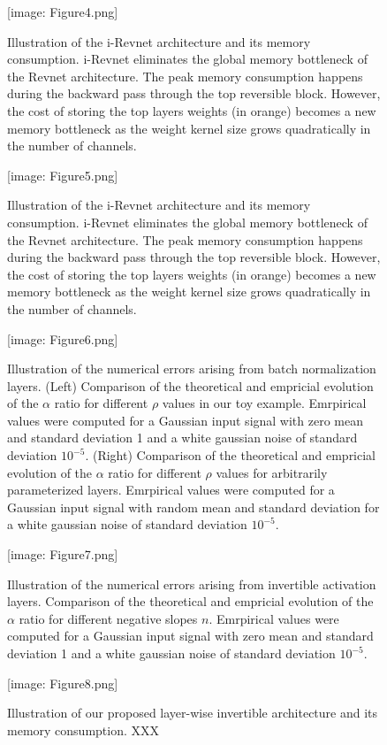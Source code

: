 \documentclass[twocolumn]{bmcart}
\def\texttt{[image: ]}
\begin{document}
\begin{backmatter}
\begin{figure}[t]
\texttt{[image: Figure4.png]}
\caption{
Illustration of the i-Revnet architecture and its memory consumption.
i-Revnet eliminates the global memory bottleneck of the Revnet architecture.
The peak memory consumption happens during the backward pass through the top reversible block.
However, the cost of storing the top layers weights (in orange) becomes a new memory bottleneck as the 
weight kernel size grows quadratically in the number of channels.
}
\end{figure}

\begin{figure}[t]
\texttt{[image: Figure5.png]}
\caption{
Illustration of the i-Revnet architecture and its memory consumption.
i-Revnet eliminates the global memory bottleneck of the Revnet architecture.
The peak memory consumption happens during the backward pass through the top reversible block.
However, the cost of storing the top layers weights (in orange) becomes a new memory bottleneck as the 
weight kernel size grows quadratically in the number of channels.
}
\end{figure}

\begin{figure}[t]
\texttt{[image: Figure6.png]}
\caption{
Illustration of the numerical errors arising from batch normalization layers.
(Left) Comparison of the theoretical and empricial evolution of the $\alpha$ ratio for different $\rho$ values in our toy example.
Emrpirical values were computed for a Gaussian input signal with zero mean and standard deviation 1 and a white gaussian noise of standard deviation $10^{-5}$.
(Right) Comparison of the theoretical and empricial evolution of the $\alpha$ ratio for different $\rho$ values for arbitrarily parameterized layers.
Emrpirical values were computed for a Gaussian input signal with random mean and standard deviation for a white gaussian noise of standard deviation $10^{-5}$.
}
\end{figure}

\begin{figure}[t]
\texttt{[image: Figure7.png]}
\caption{
Illustration of the numerical errors arising from invertible activation layers.
Comparison of the theoretical and empricial evolution of the $\alpha$ ratio for different negative slopes $n$.
Emrpirical values were computed for a Gaussian input signal with zero mean and standard deviation 1 and a white gaussian noise of standard deviation $10^{-5}$.
}
\end{figure}
\begin{figure}[t]
\texttt{[image: Figure8.png]}
\caption{
Illustration of our proposed layer-wise invertible architecture and its memory consumption. 
XXX
}
\end{figure}


\end{backmatter}
\end{document}
